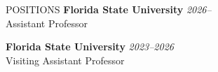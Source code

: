 

\begin{rSection}{POSITIONS}
	{\bf Florida State University} \hfill 
	{\em 2026--} 
	\\ 
	Assistant Professor \smallskip
	
	{\bf Florida State University} \hfill 
	{\em 2023--2026} 
	\\ 
	Visiting Assistant Professor \smallskip
	
	
\end{rSection}


